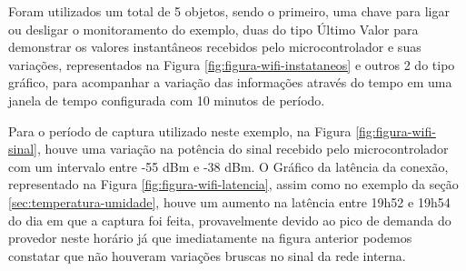        \begin{figure}[!h]
    	\end{figure}


Foram utilizados um total de 5 objetos, sendo o primeiro, uma chave para ligar ou desligar o monitoramento do exemplo, duas do tipo Último Valor para demonstrar os valores instantâneos recebidos pelo microcontrolador e suas variações, representados na Figura \ref{fig:figura-wifi-instataneos} e outros 2 do tipo gráfico, para acompanhar a variação das informações através do tempo em uma janela de tempo configurada com 10 minutos de período. 

        \begin{figure}[!h]
    	\end{figure}
\newpage

Para o período de captura utilizado neste exemplo, na Figura \ref{fig:figura-wifi-sinal}, houve uma variação na potência do sinal recebido pelo microcontrolador com um intervalo entre -55 dBm e -38 dBm. O Gráfico da latência da conexão, representado na Figura \ref{fig:figura-wifi-latencia}, assim como no exemplo da seção \ref{sec:temperatura-umidade}, houve um aumento na latência entre 19h52 e 19h54 do dia em que a captura foi feita, provavelmente devido ao pico de demanda do provedor neste horário já que imediatamente na figura anterior podemos constatar que não houveram variações bruscas no sinal da rede interna.
    	

